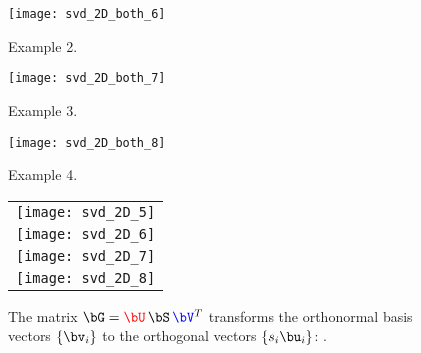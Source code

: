 \documentclass[11pt,titlepage,fleqn]{article}
\begin{document}
\clearpage\pagebreak
\begin{figure}
\hspace{-1cm}
\texttt{[image: svd\_2D\_both\_6]}
\caption[]
{{
Example 2.
\label{fig:ex2}
}}
\end{figure}

\clearpage\pagebreak
\begin{figure}
\hspace{-1cm}
\texttt{[image: svd\_2D\_both\_7]}
\caption[]
{{
Example 3.
\label{fig:ex3}
}}
\end{figure}

\clearpage\pagebreak
\begin{figure}
\hspace{-1cm}
\texttt{[image: svd\_2D\_both\_8]}
\caption[]
{{
Example 4.
\label{fig:ex4}
}}
\end{figure}

\clearpage\pagebreak
\pagestyle{empty}
\begin{figure}
\centering
\begin{tabular}{c}
\texttt{[image: svd\_2D\_5]} \\
\texttt{[image: svd\_2D\_6]} \\
\texttt{[image: svd\_2D\_7]} \\
\texttt{[image: svd\_2D\_8]} 
\end{tabular}
\caption[]
{{
The matrix $\bG = \Ucolor\,\bS\,\Vcolor^T$ transforms the orthonormal basis vectors \textcolor{blue}{$\{\bv_i\}$} to the orthogonal vectors \textcolor{red}{$\{s_i\bu_i\}$}: \makebox{$\bG\Vcolor = \Ucolor\,\bS$}.
\label{fig:2D}
}}
\end{figure}

\end{document}
